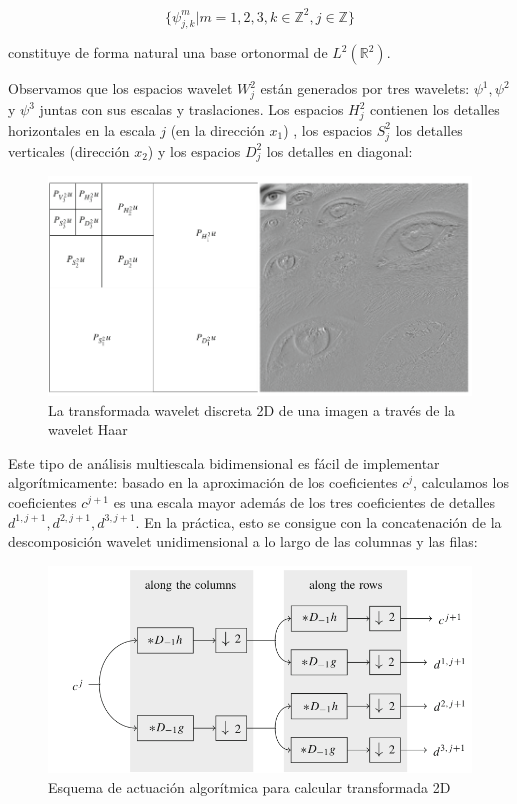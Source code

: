 \begin{itemize}
$$\{\psi_{j,k}^m | m = 1,2,3, k\in \mathbb{Z}^2, j \in \mathbb{Z}\}$$

constituye de forma natural una base ortonormal de $L^2(\mathbb{R}^2)$.

Observamos que los espacios wavelet $W_j^2$ están generados por tres wavelets: $\psi^1, \psi^2$ y $\psi^3$ juntas con sus escalas y traslaciones. Los espacios $H_j^2$ contienen los detalles horizontales en la escala $j$ (en la dirección $x_1$) , los espacios $S_j^2$ los detalles verticales (dirección $x_2$) y los espacios $D_j^2$ los detalles en diagonal:

\begin{figure}[H] %
	\centering
	\includegraphics[scale=0.5]{wav.png}  %
	\caption{La transformada wavelet discreta 2D de una imagen a través de la wavelet Haar} 
	\label{fig:wav}
\end{figure}

Este tipo de análisis multiescala bidimensional es fácil de implementar algorítmicamente: basado en la aproximación de los coeficientes $c^j$, calculamos los coeficientes $c^{j+1}$ es una escala mayor además de los tres coeficientes de detalles $d^{1,j+1}, d^{2,j+1}, d^{3,j+1}$. En la práctica, esto se consigue con la concatenación de la descomposición wavelet unidimensional a lo largo de las columnas y las filas:

\begin{figure}[H] %
	\centering
	\includegraphics[scale=0.5]{esquema.png}  %
	\caption{Esquema de actuación algorítmica para calcular transformada 2D} 
	\label{fig:esquema}
\end{figure}
\end{itemize}

